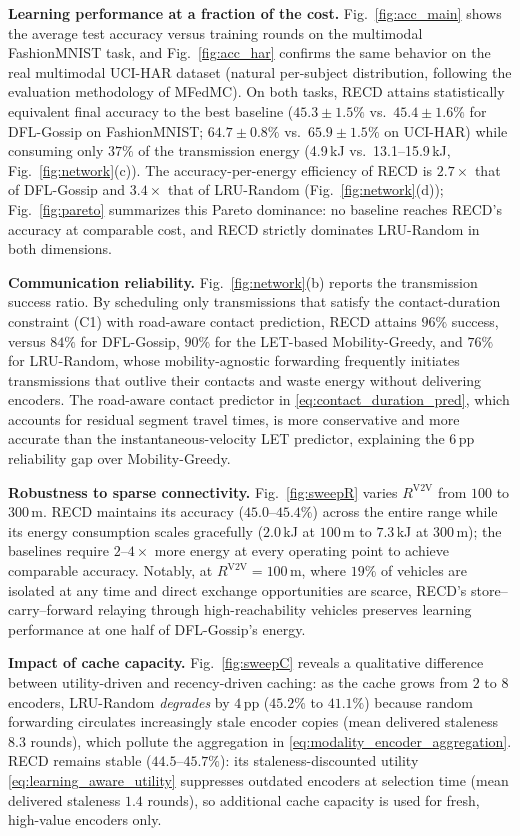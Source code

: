 \textbf{Learning performance at a fraction of the cost.}
Fig.~\ref{fig:acc_main} shows the average test accuracy versus training
rounds on the multimodal FashionMNIST task, and Fig.~\ref{fig:acc_har}
confirms the same behavior on the real multimodal UCI-HAR dataset
(natural per-subject distribution, following the evaluation methodology of
MFedMC). On both tasks, RECD attains statistically equivalent final
accuracy to the best baseline ($45.3{\pm}1.5\%$ vs.\ $45.4{\pm}1.6\%$ for
DFL-Gossip on FashionMNIST; $64.7{\pm}0.8\%$ vs.\ $65.9{\pm}1.5\%$ on
UCI-HAR) while consuming only $37\%$ of the transmission energy
(4.9\,kJ vs.\ 13.1--15.9\,kJ, Fig.~\ref{fig:network}(c)). The
accuracy-per-energy efficiency of RECD is $2.7\times$ that of DFL-Gossip
and $3.4\times$ that of LRU-Random (Fig.~\ref{fig:network}(d));
Fig.~\ref{fig:pareto} summarizes this Pareto dominance: no baseline
reaches RECD's accuracy at comparable cost, and RECD strictly dominates
LRU-Random in both dimensions.

\textbf{Communication reliability.}
Fig.~\ref{fig:network}(b) reports the transmission success ratio. By
scheduling only transmissions that satisfy the contact-duration constraint
(C1) with road-aware contact prediction, RECD attains $96\%$ success,
versus $84\%$ for DFL-Gossip, $90\%$ for the LET-based Mobility-Greedy,
and $76\%$ for LRU-Random, whose mobility-agnostic forwarding frequently
initiates transmissions that outlive their contacts and waste energy
without delivering encoders. The road-aware contact predictor in
\eqref{eq:contact_duration_pred}, which accounts for residual segment
travel times, is more conservative and more accurate than the
instantaneous-velocity LET predictor, explaining the $6$\,pp reliability
gap over Mobility-Greedy.

\textbf{Robustness to sparse connectivity.}
Fig.~\ref{fig:sweepR} varies $R^{\mathrm{V2V}}$ from $100$ to $300$\,m.
RECD maintains its accuracy ($45.0$--$45.4\%$) across the entire range
while its energy consumption scales gracefully ($2.0$\,kJ at $100$\,m to
$7.3$\,kJ at $300$\,m); the baselines require $2$--$4\times$ more energy
at every operating point to achieve comparable accuracy. Notably, at
$R^{\mathrm{V2V}}{=}100$\,m, where $19\%$ of vehicles are isolated at any
time and direct exchange opportunities are scarce, RECD's
store--carry--forward relaying through high-reachability vehicles
preserves learning performance at one half of DFL-Gossip's energy.

\textbf{Impact of cache capacity.}
Fig.~\ref{fig:sweepC} reveals a qualitative difference between
utility-driven and recency-driven caching: as the cache grows from $2$ to
$8$ encoders, LRU-Random \emph{degrades} by $4$\,pp ($45.2\%$ to
$41.1\%$) because random forwarding circulates increasingly stale encoder
copies (mean delivered staleness $8.3$ rounds), which pollute the
aggregation in \eqref{eq:modality_encoder_aggregation}. RECD remains
stable ($44.5$--$45.7\%$): its staleness-discounted utility
\eqref{eq:learning_aware_utility} suppresses outdated encoders at
selection time (mean delivered staleness $1.4$ rounds), so additional
cache capacity is used for fresh, high-value encoders only.

